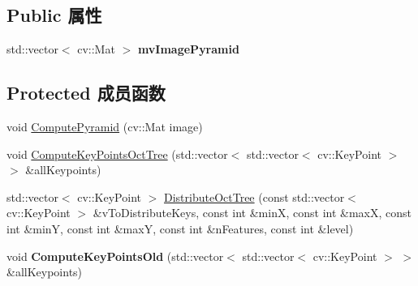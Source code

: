 \subsection*{Public 属性}
\begin{DoxyCompactItemize}
\item 
\hypertarget{classORB__SLAM2_1_1ORBextractor_a57f88e0959582dde9ae5bdee1fe3de65}{std\-::vector$<$ cv\-::\-Mat $>$ {\bfseries mv\-Image\-Pyramid}}\label{classORB__SLAM2_1_1ORBextractor_a57f88e0959582dde9ae5bdee1fe3de65}

\end{DoxyCompactItemize}
\subsection*{Protected 成员函数}
\begin{DoxyCompactItemize}
\item 
void \hyperlink{classORB__SLAM2_1_1ORBextractor_a058f24d80bb0b2c7d6fc0bdd3d9144d1}{Compute\-Pyramid} (cv\-::\-Mat image)
\item 
void \hyperlink{classORB__SLAM2_1_1ORBextractor_a9a543d9b2aec1e521058ee9522937adc}{Compute\-Key\-Points\-Oct\-Tree} (std\-::vector$<$ std\-::vector$<$ cv\-::\-Key\-Point $>$ $>$ \&all\-Keypoints)
\item 
std\-::vector$<$ cv\-::\-Key\-Point $>$ \hyperlink{classORB__SLAM2_1_1ORBextractor_ac6b7b27447324af33fa60d6dc0c8ffa0}{Distribute\-Oct\-Tree} (const std\-::vector$<$ cv\-::\-Key\-Point $>$ \&v\-To\-Distribute\-Keys, const int \&min\-X, const int \&max\-X, const int \&min\-Y, const int \&max\-Y, const int \&n\-Features, const int \&level)
\item 
\hypertarget{classORB__SLAM2_1_1ORBextractor_a56890a2032077fbfdf48687786985548}{void {\bfseries Compute\-Key\-Points\-Old} (std\-::vector$<$ std\-::vector$<$ cv\-::\-Key\-Point $>$ $>$ \&all\-Keypoints)}\label{classORB__SLAM2_1_1ORBextractor_a56890a2032077fbfdf48687786985548}

\end{DoxyCompactItemize}
